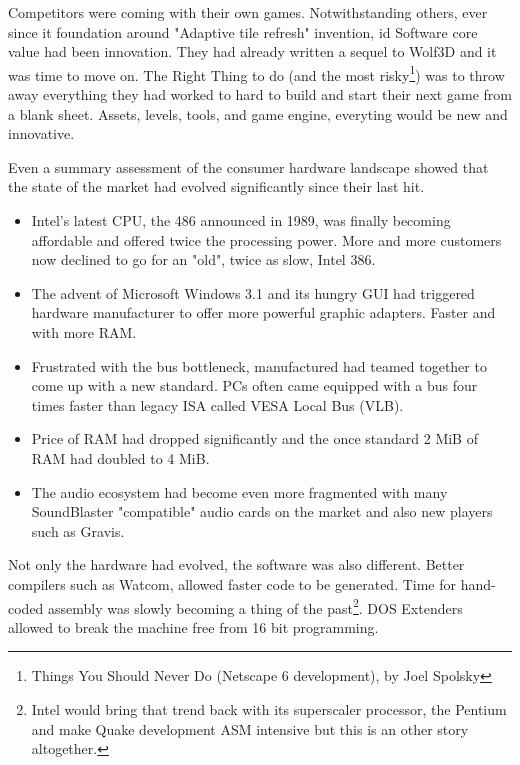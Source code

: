 Competitors were coming with their own games. Notwithstanding others, ever since it foundation around "Adaptive tile refresh" invention, id Software core value had been innovation. They had already written a sequel to Wolf3D and it was time to move on. The Right Thing to do (and the most risky\footnote{Things You Should Never Do (Netscape 6 development), by Joel Spolsky}) was to throw away everything they had worked to hard to build and start their next game from a blank sheet. Assets, levels, tools, and game engine, everyting would be new and innovative.\\
\par
Even a summary assessment of the consumer hardware landscape showed that the state of the market had evolved significantly since their last hit.\\
\begin{itemize}
\item Intel's latest CPU, the 486 announced in 1989, was finally becoming affordable and offered twice the processing power. More and more customers now declined to go for an "old", twice as slow, Intel 386. 
\item The advent of Microsoft Windows 3.1 and its hungry GUI had triggered hardware manufacturer to offer more powerful graphic adapters. Faster and with more RAM.
\item Frustrated with the bus bottleneck, manufactured had teamed together to come up with a new standard. PCs often came equipped with a bus four times faster than legacy ISA called VESA Local Bus (VLB). 
\item Price of RAM had dropped significantly and the once standard 2 MiB of RAM had doubled to 4 MiB. 
\item The audio ecosystem had become even more fragmented with many SoundBlaster "compatible" audio cards on the market and also new players such as Gravis.\\
\end{itemize}
 \par 
 Not only the hardware had evolved, the software was also different. Better compilers such as Watcom, allowed faster code to be generated. Time for hand-coded assembly was slowly becoming a thing of the past\footnote{Intel would bring that trend back with its superscaler processor, the Pentium and make Quake development ASM intensive but this is an other story altogether.}. DOS Extenders allowed to break the machine free from 16 bit programming.\\
 \par

